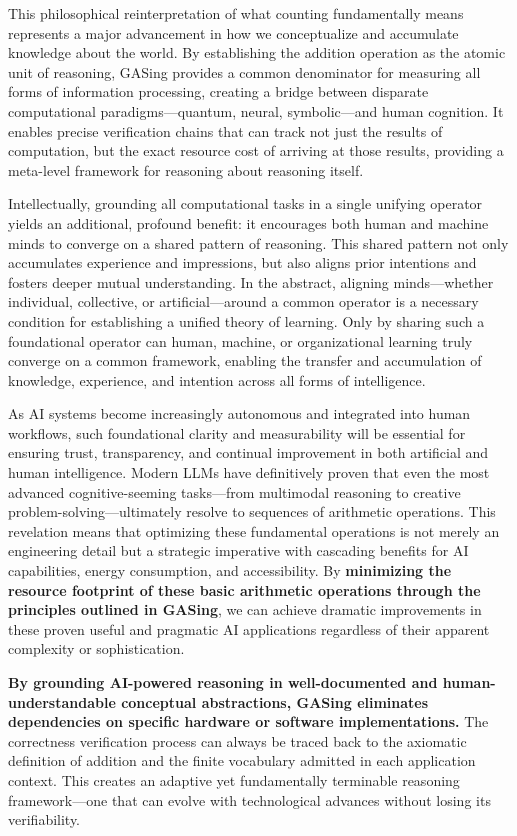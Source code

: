 This philosophical reinterpretation of what counting fundamentally means represents a major advancement in how we conceptualize and accumulate knowledge about the world. By establishing the addition operation as the atomic unit of reasoning, GASing provides a common denominator for measuring all forms of information processing, creating a bridge between disparate computational paradigms—quantum, neural, symbolic—and human cognition. It enables precise verification chains that can track not just the results of computation, but the exact resource cost of arriving at those results, providing a meta-level framework for reasoning about reasoning itself.

Intellectually, grounding all computational tasks in a single unifying operator yields an additional, profound benefit: it encourages both human and machine minds to converge on a shared pattern of reasoning. This shared pattern not only accumulates experience and impressions, but also aligns prior intentions and fosters deeper mutual understanding. In the abstract, aligning minds—whether individual, collective, or artificial—around a common operator is a necessary condition for establishing a unified theory of learning. Only by sharing such a foundational operator can human, machine, or organizational learning truly converge on a common framework, enabling the transfer and accumulation of knowledge, experience, and intention across all forms of intelligence.

As AI systems become increasingly autonomous and integrated into human workflows, such foundational clarity and measurability will be essential for ensuring trust, transparency, and continual improvement in both artificial and human intelligence. Modern LLMs have definitively proven that even the most advanced cognitive-seeming tasks—from multimodal reasoning to creative problem-solving—ultimately resolve to sequences of arithmetic operations. This revelation means that optimizing these fundamental operations is not merely an engineering detail but a strategic imperative with cascading benefits for AI capabilities, energy consumption, and accessibility. By \textbf{minimizing the resource footprint of these basic arithmetic operations through the principles outlined in GASing}, we can achieve dramatic improvements in these proven useful and pragmatic AI applications regardless of their apparent complexity or sophistication.

\textbf{By grounding AI-powered reasoning in well-documented and human-understandable conceptual abstractions, GASing eliminates dependencies on specific hardware or software implementations.} The correctness verification process can always be traced back to the axiomatic definition of addition and the finite vocabulary admitted in each application context. This creates an adaptive yet fundamentally terminable reasoning framework—one that can evolve with technological advances without losing its verifiability. 
